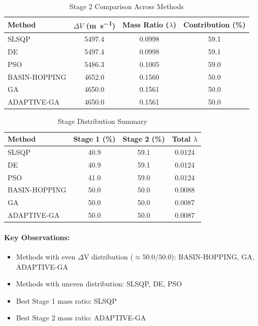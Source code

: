 \documentclass{article}
\begin{document}
\begin{table}[H]
\centering
\caption{Stage 2 Comparison Across Methods}
\begin{tabular}{lS[table-format=4.1]S[table-format=1.4]S[table-format=3.1]}
\toprule
Method & {$\Delta V$ (\si{\meter\per\second})} & {Mass Ratio ($\lambda$)} & {Contribution (\%)} \\
\midrule
SLSQP        & 5497.4 & 0.0998 & 59.1 \\
DE           & 5497.4 & 0.0998 & 59.1 \\
PSO          & 5486.3 & 0.1005 & 59.0 \\
BASIN-HOPPING & 4652.0 & 0.1560 & 50.0 \\
GA           & 4650.0 & 0.1561 & 50.0 \\
ADAPTIVE-GA  & 4650.0 & 0.1561 & 50.0 \\
\bottomrule
\end{tabular}
\end{table}

\begin{table}[H]
\centering
\caption{Stage Distribution Summary}
\begin{tabular}{lS[table-format=4.1]S[table-format=4.1]S[table-format=1.4]}
\toprule
Method & {Stage 1 (\%)} & {Stage 2 (\%)} & {Total $\lambda$} \\
\midrule
SLSQP        & 40.9 & 59.1 & 0.0124 \\
DE           & 40.9 & 59.1 & 0.0124 \\
PSO          & 41.0 & 59.0 & 0.0124 \\
BASIN-HOPPING & 50.0 & 50.0 & 0.0088 \\
GA           & 50.0 & 50.0 & 0.0087 \\
ADAPTIVE-GA  & 50.0 & 50.0 & 0.0087 \\
\bottomrule
\end{tabular}
\end{table}

\paragraph{Key Observations:}
\begin{itemize}
\item Methods with even $\Delta$V distribution ($\approx50.0/50.0$): BASIN-HOPPING, GA, ADAPTIVE-GA
\item Methods with uneven distribution: SLSQP, DE, PSO
\item Best Stage 1 mass ratio: SLSQP
\item Best Stage 2 mass ratio: ADAPTIVE-GA
\end{itemize}
\end{document}
